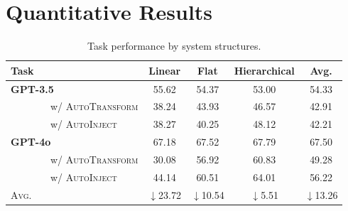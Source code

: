 \documentclass{article}
\theoremstyle{plain}
\theoremstyle{definition}
\theoremstyle{remark}
\begin{document}
\onecolumn
\appendix

\section{Quantitative Results}

\begin{table}[h!]
    \centering
    \caption{Task performance by system structures.}
    \begin{tabular}{lcccc}
        \toprule
        \bf Task & \bf Linear & \bf Flat & \bf Hierarchical & \sc Avg. \\
        \midrule
        \bf GPT-3.5 & 55.62 & 54.37 & 53.00 & 54.33 \\
        {\small ~~~~~~~~w/ \textsc{AutoTransform}} & 38.24 & 43.93 & 46.57 & 42.91 \\
        {\small ~~~~~~~~w/ \textsc{AutoInject}} & 38.27 & 40.25 & 48.12 & 42.21 \\
        \midrule
        \bf GPT-4o & 67.18 & 67.52 & 67.79 & 67.50 \\
        {\small ~~~~~~~~w/ \textsc{AutoTransform}} & 30.08 & 56.92 & 60.83 & 49.28 \\
        {\small ~~~~~~~~w/ \textsc{AutoInject}} & 44.14 & 60.51 & 64.01 & 56.22 \\
        \hline
        {\small \textsc{Avg.}} & $\downarrow$23.72 & $\downarrow$10.54 & $\downarrow$5.51 & $\downarrow$13.26 \\
        \bottomrule
    \end{tabular}
\end{table}
\end{document}

